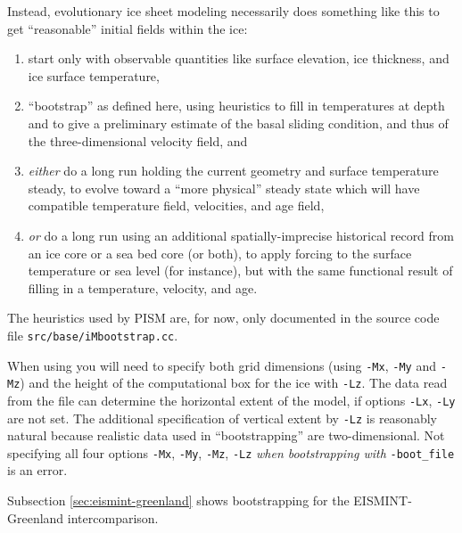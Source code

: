 \documentclass[titlepage,letterpaper,final]{scrartcl}
\begin{document}
Instead, evolutionary ice sheet modeling necessarily does something like this
to get ``reasonable'' initial fields within the ice:
\begin{enumerate}
\item start only with observable quantities like surface elevation, ice thickness, and ice surface temperature,
\item ``bootstrap'' as defined here, using heuristics to fill in temperatures at depth and to give a preliminary estimate of the basal sliding condition, and thus of the three-dimensional velocity field, and
\item \emph{either} do a long run holding the current geometry and surface temperature steady,  to evolve toward a ``more physical'' steady state which will have compatible temperature field, velocities, and age field,
\item \emph{or} do a long run using an additional spatially-imprecise historical record from an ice core or a sea bed core (or both), to apply forcing to the surface temperature or sea level (for instance), but with the same functional result of filling in a temperature, velocity, and age.
\end{enumerate}

The heuristics used by PISM are, for now, only documented in the source code file \texttt{src/base/iMbootstrap.cc}.

When using  you will need to specify both grid dimensions (using \texttt{-Mx}, \texttt{-My} and \texttt{-Mz}) and the height of the computational box for the ice with \texttt{-Lz}.  The data read from the file can determine the horizontal extent of the model, if options \texttt{-Lx}, \texttt{-Ly} are not set.  The additional specification of vertical extent by \texttt{-Lz} is reasonably natural because realistic data used in ``bootstrapping'' are two-dimensional.  Not specifying all four options \texttt{-Mx}, \texttt{-My}, \texttt{-Mz}, \texttt{-Lz} \emph{when bootstrapping with} \texttt{-boot_file} is an error.

Subsection \ref{sec:eismint-greenland} shows bootstrapping for the EISMINT-Greenland intercomparison.
\end{document}
